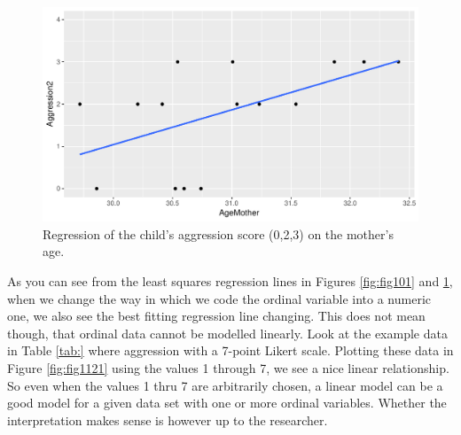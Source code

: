 \documentclass[]{book}\usepackage[]{graphicx}\usepackage[]{color}
\makeatletter
\def\maxwidth{ %
  \ifdim\Gin@nat@width>\linewidth
    \linewidth
  \else
    \Gin@nat@width
  \fi
}
\newenvironment{knitrout}{}{} %
\makeatother
\begin{document}
\begin{knitrout}
\color{fgcolor}\begin{figure}

{\centering \includegraphics[width=\maxwidth]{figure/fig1114-1} 

}

\caption[Regression of the child's aggression score (0,2,3) on the mother's age]{Regression of the child's aggression score (0,2,3) on the mother's age.}\label{fig:fig1114}
\end{figure}


\end{knitrout}

As you can see from the least squares regression lines in Figures \ref{fig:fig101} and \ref{fig:fig1114}, when we change the way in which we code the ordinal variable into a numeric one, we also see the best fitting regression line changing. This does not mean though, that ordinal data cannot be modelled linearly. Look at the example data in Table \ref{tab:} where aggression with a 7-point Likert scale. Plotting these data in Figure \ref{fig:fig1121} using the values 1 through 7, we see a nice linear relationship. So even when the values 1 thru 7 are arbitrarily chosen, a linear model can be a good model for a given data set with one or more ordinal variables. Whether the interpretation makes sense is however up to the researcher. 
\end{document}
